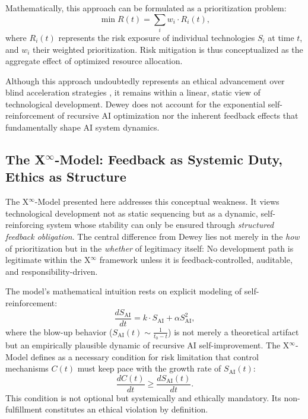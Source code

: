 \documentclass[11pt]{article}
\begin{document}
Mathematically, this approach can be formulated as a prioritization problem:
\begin{equation}
\min R(t) = \sum_i w_i \cdot R_i(t),
\end{equation}
where $R_i(t)$ represents the risk exposure of individual technologies $S_i$ at time $t$, and $w_i$ their weighted prioritization. Risk mitigation is thus conceptualized as the aggregate effect of optimized resource allocation.

Although this approach undoubtedly represents an ethical advancement over blind acceleration strategies \citep{TrammellAschenbrenner2024}, it remains within a linear, static view of technological development. Dewey does not account for the exponential self-reinforcement of recursive AI optimization nor the inherent feedback effects that fundamentally shape AI system dynamics.

\subsection{The X$^\infty$-Model: Feedback as Systemic Duty, Ethics as Structure}
The X$^\infty$-Model presented here addresses this conceptual weakness. It views technological development not as static sequencing but as a dynamic, self-reinforcing system whose stability can only be ensured through \emph{structured feedback obligation}. The central difference from Dewey lies not merely in the \emph{how} of prioritization but in the \emph{whether} of legitimacy itself: No development path is legitimate within the X$^\infty$ framework unless it is feedback-controlled, auditable, and responsibility-driven.

The model’s mathematical intuition rests on explicit modeling of self-reinforcement:
\begin{equation}
\frac{d S_{\text{AI}}}{dt} = k \cdot S_{\text{AI}} + \alpha S_{\text{AI}}^2,
\end{equation}
where the blow-up behavior ($S_{\text{AI}}(t) \sim \frac{1}{t_0 - t}$) is not merely a theoretical artifact but an empirically plausible dynamic of recursive AI self-improvement. The X$^\infty$-Model defines as a necessary condition for risk limitation that control mechanisms $C(t)$ must keep pace with the growth rate of $S_{\text{AI}}(t)$:
\begin{equation}
\frac{d C(t)}{dt} \geq \frac{d S_{\text{AI}}(t)}{dt}.
\end{equation}
This condition is not optional but systemically and ethically mandatory. Its non-fulfillment constitutes an ethical violation by definition.
\end{document}
